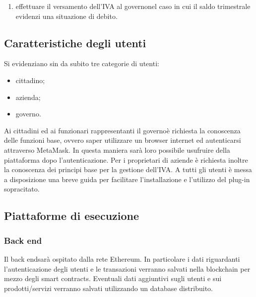 \begin{itemize}
\begin{enumerate}[label=\alph*.]
\begin{enumerate}[label=\roman*.]
			\item \textbf{l'azienda ha selezionato la dilazione\glosp del pagamento}: viene inviata la conferma dell'ordine. Successivamente l'azienda può confermare o rifiutare l'ordine. In caso di conferma il venditore procede con la consegna del prodotto/servizio, mentre il compratore è legalmente vincolato al pagamento futuro.  
		\end{enumerate}
		In entrambi i casi, in caso di rifiuto della proposta d'ordine, i soldi trattenuti vengono restituiti al compratore, mentre il venditore non invia nessun prodotto/servizio.
		\item effettuare il versamento dell'IVA al governo\glosp nel caso in cui il saldo trimestrale evidenzi una situazione di debito.
	\end{enumerate}

\end{itemize}
\subsection{Caratteristiche degli utenti}
Si evidenziano sin da subito tre categorie di utenti:
\begin{itemize}
	\item cittadino;
	\item azienda;
	\item governo\glo.
\end{itemize}
Ai cittadini ed ai funzionari rappresentanti il governo\glosp è richiesta la conoscenza delle funzioni base, ovvero saper utilizzare un browser internet ed autenticarsi attraverso MetaMask\glo. In questa maniera sarà loro possibile usufruire  della piattaforma dopo l'autenticazione. Per i proprietari di aziende è richiesta inoltre la conoscenza dei principi base per la gestione dell'IVA. A tutti gli utenti è messa a disposizione una breve guida per facilitare l'installazione e l'utilizzo del plug-in sopracitato. 

\subsection{Piattaforme di esecuzione}
\subsubsection{Back end}
Il back end\glosp sarà ospitato dalla rete Ethereum\glo. In particolare i dati riguardanti l'autenticazione degli utenti e le transazioni verranno salvati nella blockchain per mezzo degli smart contracts\glo. Eventuali dati aggiuntivi sugli utenti e sui prodotti/servizi verranno salvati utilizzando un database distribuito.

